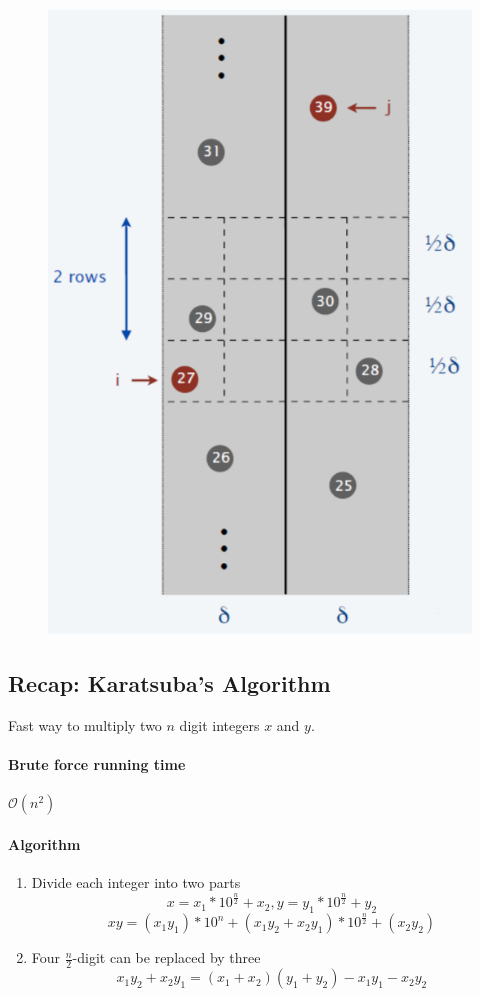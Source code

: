 \documentclass[11pt]{article}
\begin{document}
\begin{figure}[h]
	\centering
	\includegraphics[scale=0.7]{p3}
\end{figure}

\subsection{Recap: Karatsuba's Algorithm}
Fast way to multiply two $n$ digit integers $x$ and $y$.
\paragraph{Brute force running time}
$\mathcal{O}(n^2)$

\paragraph{Algorithm}
\begin{enumerate}
	\item Divide each integer into two parts
	$$ x = x_1 * 10^{\frac{n}{2}} + x_2, y = y_1 * 10^{\frac{n}{2}} + y_2$$
	$$ xy = (x_1y_1) * 10^n + (x_1y_2 + x_2y_1) * 10^{\frac{n}{2}} + (x_2y_2)$$
	\item Four $\frac{n}{2}$-digit can be replaced by three
	$$x_1y_2 + x_2y_1 = (x_1 + x_2)(y_1 + y_2) - x_1y_1 - x_2y_2$$
\end{enumerate}
\end{document}
